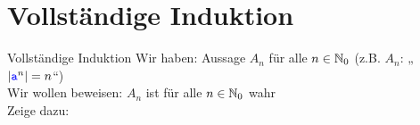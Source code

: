 


\morescalingdelimiters



\section{Vollständige Induktion}

\morescalingdelimiters

\begin{frame}{Vollständige Induktion}
	Wir haben: Aussage $A_n$ für alle $n \in \mathbb{N}_0$ \quad (z.B. $A_n$: „$\left\lvert \hbox{\textcolor{blue}{\texttt{a}}}^n \right\rvert = n$“) \\
	Wir wollen beweisen: $A_n$ ist für alle $n \in \mathbb{N}_0$ wahr \\[0.5em]
	\pause
	Zeige dazu: 
\end{frame}

